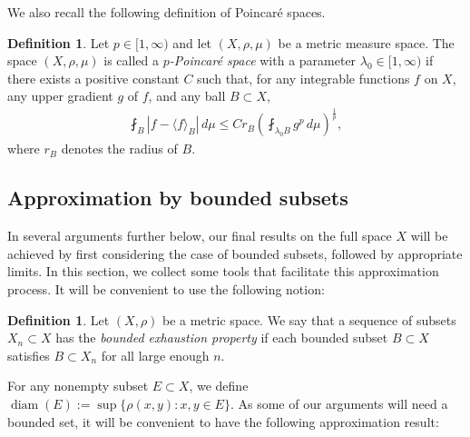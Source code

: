 \documentclass[11pt]{amsart}
\theoremstyle{definition}
\newtheorem{definition}[theorem]{Definition}
\theoremstyle{remark}
\numberwithin{equation}{section}
\newcommand{\ave}[1]{\langle #1\rangle}
\begin{document}
We also recall the following definition of Poincar\'e spaces.

\begin{definition}
Let $p\in[1,\infty)$ and let $(X,\rho,\mu)$ be a metric measure space.
The space $(X,\rho,\mu)$ is called a \emph{$p$-Poincar\'e space}
with a parameter $\lambda_0\in [1,\infty)$
if there exists a positive constant $C$ such that,
for any integrable functions $f$ on $X$, any upper gradient
$g$ of $f$, and any ball $B\subset X$,
\begin{align*}
\fint_B|f-\ave{f}_B| \, d\mu \le C r_B
\left(\fint_{\lambda_0 B} g^p \, d\mu\right)^{\frac1p},
\end{align*}
where $r_B$ denotes the radius of $B$.
\end{definition}


\subsection{Approximation by bounded subsets}\label{sec:bdApprox}

In several arguments further below, our final results on the full space $X$ will be achieved
by first considering the case of bounded subsets, followed by appropriate limits. In this
section, we collect some tools that facilitate this approximation process. It will be
convenient to use the following notion:

\begin{definition}\label{def:bdExhaustion}
Let $(X,\rho)$ be a metric space. We say that a sequence of subsets $X_n\subset X$ has the
{\em bounded exhaustion property} if each bounded subset $B\subset X$ satisfies $B\subset
X_n$ for all large enough $n$.
\end{definition}

For any nonempty subset $E\subset X$, we define $
\operatorname{diam}(E):=\sup\{\rho(x,y):x,y\in E\}$.
As some of our arguments will need a bounded set, it will be convenient to have the
following approximation result:
\end{document}
